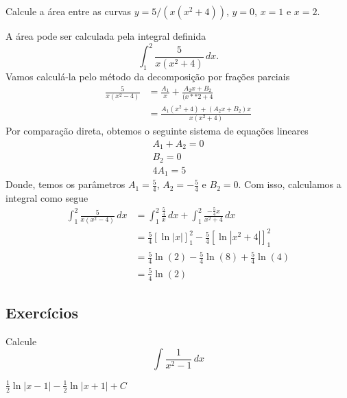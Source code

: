 \begin{exeresol}
  Calcule a área entre as curvas $y=5/(x(x^2+4))$, $y=0$, $x=1$ e $x=2$.
\end{exeresol}
\begin{resol}
  A área pode ser calculada pela integral definida
  \begin{equation}
    \int_{1}^{2}\frac{5}{x(x^2+4)}\,dx.
  \end{equation}
  Vamos calculá-la pelo método da decomposição por frações parciais
  \begin{align}
    \frac{5}{x(x^2-4)} &= \frac{A_1}{x} + \frac{A_2x+B_2}{(x**2+4}\\
                       &= \frac{A_1(x^2+4) + (A_2x+B_2)x}{x(x^2+4)}
  \end{align}
  Por comparação direta, obtemos o seguinte sistema de equações lineares
  \begin{gather}
    A_1+A_2=0\\
    B_2=0\\
    4A_1=5
  \end{gather}
  Donde, temos os parâmetros $A_1=\frac{5}{4}$, $A_2 = -\frac{5}{4}$ e $B_2=0$. Com isso, calculamos a integral como segue
  \begin{align}
    \int_{1}^{2}\frac{5}{x(x^2-4)}\,dx &= \int_1^2\frac{\frac{5}{4}}{x}\,dx + \int_1^2\frac{-\frac{5}{4}x}{x^2+4}\,dx\\
                                       &= \frac{5}{4}\left[\ln|x|\right]_1^2 - \frac{5}{4}\left[\ln|x^2+4|\right]_1^2\\
                                       &= \frac{5}{4}\ln(2) - \frac{5}{4}\ln(8) + \frac{5}{4}\ln(4)\\
                                       &= \frac{5}{4}\ln(2)
  \end{align}
\end{resol}

\subsection{Exercícios}

\begin{exer}
  Calcule
  \begin{equation}
    \int\frac{1}{x^2-1}\,dx
  \end{equation}
\end{exer}
\begin{resp}
  $\frac{1}{2}\ln|x-1| - \frac{1}{2}\ln|x+1| + C$
\end{resp}

